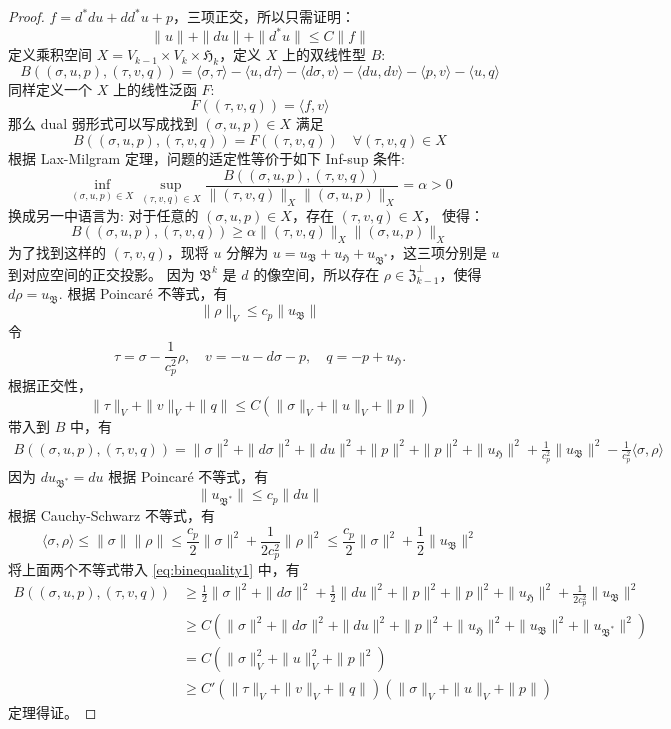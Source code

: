 \documentclass[lang=cn,a4paper,newtx]{elegantpaper}
\begin{document}
\begin{proof}
  $f = d^* du + d d^* u + p$，三项正交，所以只需证明：
  $$
  \|u\| + \|du\| + \|d^* u\|\leq C\|f\|
  $$
  定义乘积空间 $X = V_{k-1} \times V_{k} \times \mathfrak{H}_k$，定义 
  $X$ 上的双线性型 $B$:
  $$
  B((\sigma, u, p), (\tau, v, q)) = \langle \sigma, \tau\rangle - 
  \langle u, d\tau\rangle - \langle d\sigma, v\rangle - \langle du, dv\rangle
  -\langle p, v\rangle - \langle u, q \rangle
  $$
  同样定义一个 $X$ 上的线性泛函 $F$:
  $$
  F((\tau, v, q)) = \langle f, v\rangle
  $$
  那么 dual 弱形式可以写成找到 $(\sigma, u, p) \in X$ 满足 
  $$
  B((\sigma, u, p), (\tau, v, q)) = F((\tau, v, q))\quad \forall (\tau, v, q) \in X
  $$
  根据 Lax-Milgram 定理，问题的适定性等价于如下 Inf-sup 条件:
  $$
  \inf_{(\sigma, u, p)\in X} \sup_{(\tau, v, q)\in X} \frac{B((\sigma, u, p),
  (\tau, v, q))}{\|(\tau, v, q)\|_X\|(\sigma, u, p)\|_X} = \alpha > 0
  $$
  换成另一中语言为: 对于任意的 $(\sigma, u, p) \in X$，存在 $(\tau, v, q) \in X$，
  使得：
  $$
  B((\sigma, u, p), (\tau, v, q)) \geq \alpha\|(\tau, v, q)\|_X\|(\sigma, u, p)\|_X
  $$
  为了找到这样的 $(\tau, v, q)$，现将 $u$ 分解为 $u = u_{\mathfrak{B}} +
  u_{\mathfrak{H}} + u_{\mathfrak{B}^*}$，这三项分别是 $u$ 到对应空间的正交投影。
  因为 $\mathfrak{B}^k$ 是 $d$ 的像空间，所以存在 
  $\rho \in \mathfrak{Z}_{k-1}^{\perp}$，使得 $d\rho = u_{\mathfrak{B}}$.
  根据 Poincar\'e 不等式，有
  $$
  \|\rho\|_V \leq c_p\|u_{\mathfrak{B}}\|
  $$
  令 
  $$
  \tau = \sigma - \frac{1}{c_p^2} \rho, \quad v = -u - d \sigma - p, \quad q = -p +
  u_{\mathfrak{H}}.
  $$
  根据正交性，
  $$
  \|\tau\|_V + \|v\|_V + \|q\| \leq C(\|\sigma\|_V + \|u\|_V + \|p\|)
  $$
  带入到 $B$ 中，有
  \begin{align}
  \label{eq:binequality1}
  B((\sigma, u, p), (\tau, v, q)) = \|\sigma\|^2 + 
  \|d\sigma\|^2 + \|du\|^2 + \|p\|^2 + \|p\|^2 + \|u_{\mathfrak{H}}\|^2
  + \frac{1}{c_p^2}\|u_{\mathfrak{B}}\|^2 - \frac{1}{c_p^2} \langle \sigma, \rho
  \rangle
  \end{align}
  因为 $d u_{\mathfrak{B}^*} = du$ 根据 Poincar\'e 不等式，有
  $$
  \|u_{\mathfrak{B}^*}\| \leq c_p\|du\|
  $$
  根据 Cauchy-Schwarz 不等式，有
  $$
  \langle \sigma,  \rho\rangle \leq \|\sigma\|\|\rho\| \leq
  \frac{c_p}{2}\|\sigma\|^2 + \frac{1}{2c_p^2}\|\rho\|^2 \leq
  \frac{c_p}{2}\|\sigma\|^2 + \frac{1}{2}\|u_{\mathfrak{B}}\|^2
  $$
  将上面两个不等式带入 \eqref{eq:binequality1} 中，有
  $$
  \begin{aligned}
    B((\sigma, u, p), (\tau, v, q)) & 
    \geq \frac{1}{2}\|\sigma\|^2 + \|d\sigma\|^2 + \frac{1}{2} 
    \|du\|^2 + \|p\|^2 + \|p\|^2
    + \|u_{\mathfrak{H}}\|^2 + \frac{1}{2c_p^2}\|u_{\mathfrak{B}}\|^2\\
    & \geq C (\|\sigma\|^2 + \|d\sigma\|^2 + \|du\|^2 + \|p\|^2 +
    \|u_{\mathfrak{H}}\|^2 + \|u_{\mathfrak{B}}\|^2 +
    \|u_{\mathfrak{B}^*}\|^2)\\
    & = C(\|\sigma\|_V^2 + \|u\|_V^2 + \|p\|^2)\\
    & \geq C'(\|\tau\|_V + \|v\|_V + \|q\|)(\|\sigma\|_V + \|u\|_V + \|p\|)
  \end{aligned}
  $$
  定理得证。
\end{proof}
\end{document}
